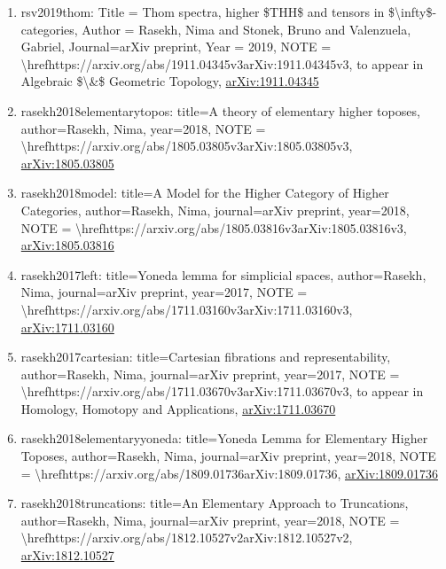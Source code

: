 \documentclass[11pt]{article}
\begin{document}
\begin{enumerate}[leftmargin=*]
  \item rsv2019thom: Title = Thom spectra, higher \$THH\$ and tensors in \$\textbackslash{}infty\$-categories, Author = Rasekh, Nima and Stonek, Bruno and Valenzuela, Gabriel, Journal=arXiv preprint, Year = 2019, NOTE = \textbackslash{}hrefhttps://arxiv.org/abs/1911.04345v3arXiv:1911.04345v3, to appear in Algebraic \$\textbackslash{}\&\$ Geometric Topology, \href{https://arxiv.org/abs/1911.04345}{arXiv:1911.04345}
  \item rasekh2018elementarytopos: title=A theory of elementary higher toposes, author=Rasekh, Nima, year=2018, NOTE = \textbackslash{}hrefhttps://arxiv.org/abs/1805.03805v3arXiv:1805.03805v3, \href{https://arxiv.org/abs/1805.03805}{arXiv:1805.03805}
  \item rasekh2018model: title=A Model for the Higher Category of Higher Categories, author=Rasekh, Nima, journal=arXiv preprint, year=2018, NOTE = \textbackslash{}hrefhttps://arxiv.org/abs/1805.03816v3arXiv:1805.03816v3, \href{https://arxiv.org/abs/1805.03816}{arXiv:1805.03816}
  \item rasekh2017left: title=Yoneda lemma for simplicial spaces, author=Rasekh, Nima, journal=arXiv preprint, year=2017, NOTE = \textbackslash{}hrefhttps://arxiv.org/abs/1711.03160v3arXiv:1711.03160v3, \href{https://arxiv.org/abs/1711.03160}{arXiv:1711.03160}
  \item rasekh2017cartesian: title=Cartesian fibrations and representability, author=Rasekh, Nima, journal=arXiv preprint, year=2017, NOTE = \textbackslash{}hrefhttps://arxiv.org/abs/1711.03670v3arXiv:1711.03670v3, to appear in Homology, Homotopy and Applications, \href{https://arxiv.org/abs/1711.03670}{arXiv:1711.03670}
  \item rasekh2018elementaryyoneda: title=Yoneda Lemma for Elementary Higher Toposes, author=Rasekh, Nima, journal=arXiv preprint, year=2018, NOTE = \textbackslash{}hrefhttps://arxiv.org/abs/1809.01736arXiv:1809.01736, \href{https://arxiv.org/abs/1809.01736}{arXiv:1809.01736}
  \item rasekh2018truncations: title=An Elementary Approach to Truncations, author=Rasekh, Nima, journal=arXiv preprint, year=2018, NOTE = \textbackslash{}hrefhttps://arxiv.org/abs/1812.10527v2arXiv:1812.10527v2, \href{https://arxiv.org/abs/1812.10527}{arXiv:1812.10527}

\end{enumerate}
\end{document}
